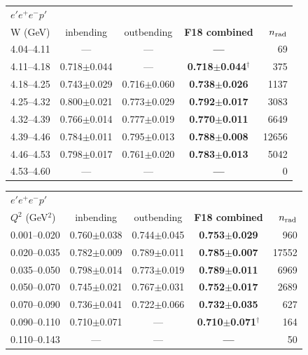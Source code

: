 \begin{tabular}{lcccr}\toprule
\multicolumn{5}{l}{$e'e^+e^-p'$}\\
W (GeV) & inbending & outbending & \textbf{F18 combined} & $n_{\rm rad}$ \\\midrule
4.04--4.11 & --- & --- & \textbf{---} & 69 \\
4.11--4.18 & 0.718$\pm$0.044 & --- & \textbf{0.718$\pm$0.044$^\dagger$} & 375 \\
4.18--4.25 & 0.743$\pm$0.029 & 0.716$\pm$0.060 & \textbf{0.738$\pm$0.026} & 1137 \\
4.25--4.32 & 0.800$\pm$0.021 & 0.773$\pm$0.029 & \textbf{0.792$\pm$0.017} & 3083 \\
4.32--4.39 & 0.766$\pm$0.014 & 0.777$\pm$0.019 & \textbf{0.770$\pm$0.011} & 6649 \\
4.39--4.46 & 0.784$\pm$0.011 & 0.795$\pm$0.013 & \textbf{0.788$\pm$0.008} & 12656 \\
4.46--4.53 & 0.798$\pm$0.017 & 0.761$\pm$0.020 & \textbf{0.783$\pm$0.013} & 5042 \\
4.53--4.60 & --- & --- & \textbf{---} & 0 \\
\bottomrule\end{tabular}

\medskip

\begin{tabular}{lcccr}\toprule
\multicolumn{5}{l}{$e'e^+e^-p'$}\\
$Q^2$ (GeV$^2$) & inbending & outbending & \textbf{F18 combined} & $n_{\rm rad}$ \\\midrule
0.001--0.020 & 0.760$\pm$0.038 & 0.744$\pm$0.045 & \textbf{0.753$\pm$0.029} & 960 \\
0.020--0.035 & 0.782$\pm$0.009 & 0.789$\pm$0.011 & \textbf{0.785$\pm$0.007} & 17552 \\
0.035--0.050 & 0.798$\pm$0.014 & 0.773$\pm$0.019 & \textbf{0.789$\pm$0.011} & 6969 \\
0.050--0.070 & 0.745$\pm$0.021 & 0.767$\pm$0.031 & \textbf{0.752$\pm$0.017} & 2689 \\
0.070--0.090 & 0.736$\pm$0.041 & 0.722$\pm$0.066 & \textbf{0.732$\pm$0.035} & 627 \\
0.090--0.110 & 0.710$\pm$0.071 & --- & \textbf{0.710$\pm$0.071$^\dagger$} & 164 \\
0.110--0.143 & --- & --- & \textbf{---} & 50 \\
\bottomrule\end{tabular}

\medskip

